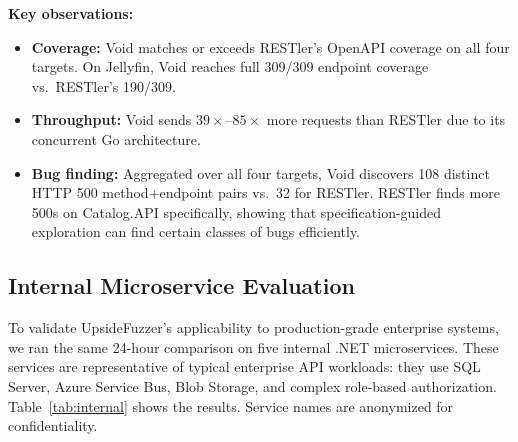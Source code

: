 \documentclass[conference]{IEEEtran}
\begin{document}
\textbf{Key observations:}
\begin{itemize}
    \item \textbf{Coverage:} Void matches or exceeds RESTler's OpenAPI coverage on all four targets. On Jellyfin, Void reaches full 309/309 endpoint coverage vs.\ RESTler's 190/309.
    \item \textbf{Throughput:} Void sends $39\times$--$85\times$ more requests than RESTler due to its concurrent Go architecture.
    \item \textbf{Bug finding:} Aggregated over all four targets, Void discovers 108 distinct HTTP 500 method+endpoint pairs vs.\ 32 for RESTler. RESTler finds more 500s on Catalog.API specifically, showing that specification-guided exploration can find certain classes of bugs efficiently.
\end{itemize}

\subsection{Internal Microservice Evaluation}
\label{sec:eval_internal}

To validate UpsideFuzzer's applicability to production-grade enterprise systems, we ran the same 24-hour comparison on five internal .NET microservices. These services are representative of typical enterprise API workloads: they use SQL Server, Azure Service Bus, Blob Storage, and complex role-based authorization. Table~\ref{tab:internal} shows the results. Service names are anonymized for confidentiality.
\end{document}

